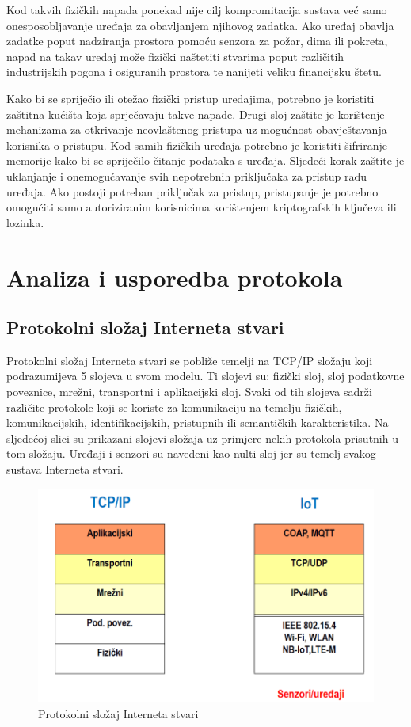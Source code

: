 \documentclass[times, utf8, diplomski]{fer}
\begin{document}
Kod takvih fizičkih napada ponekad nije cilj kompromitacija sustava već samo onesposobljavanje uređaja za obavljanjem njihovog zadatka. Ako uređaj obavlja zadatke poput nadziranja prostora pomoću senzora za požar, dima ili pokreta, napad na takav uređaj može fizički naštetiti stvarima poput različitih industrijskih pogona i osiguranih prostora te nanijeti veliku financijsku štetu.

Kako bi se spriječio ili otežao fizički pristup uređajima, potrebno je koristiti zaštitna kućišta koja sprječavaju takve napade. Drugi sloj zaštite je korištenje mehanizama za otkrivanje neovlaštenog pristupa uz mogućnost obavještavanja korisnika o pristupu. Kod samih fizičkih uređaja potrebno je koristiti šifriranje memorije kako bi se spriječilo čitanje podataka s uređaja. Sljedeći korak zaštite je uklanjanje i onemogućavanje svih nepotrebnih priključaka za pristup radu uređaja. Ako postoji potreban priključak za pristup, pristupanje je potrebno omogućiti samo autoriziranim korisnicima korištenjem kriptografskih ključeva ili lozinka.

\chapter{Analiza i usporedba protokola}

\section{Protokolni složaj Interneta stvari}
Protokolni složaj Interneta stvari se pobliže temelji na TCP/IP složaju koji podrazumijeva 5 slojeva u svom modelu. Ti slojevi su: fizički sloj, sloj podatkovne poveznice, mrežni, transportni i aplikacijski sloj. Svaki od tih slojeva sadrži različite protokole koji se koriste za komunikaciju na temelju fizičkih, komunikacijskih, identifikacijskih, pristupnih ili semantičkih karakteristika. Na sljedećoj slici su prikazani slojevi složaja uz primjere nekih protokola prisutnih u tom složaju. Uređaji i senzori su navedeni kao nulti sloj jer su temelj svakog sustava Interneta stvari. 
\begin{figure}[htb]
    \centering
    \includegraphics[width=14cm]{images/iot-stack.png}
    \caption{Protokolni složaj Interneta stvari\citep{InternetStvari}}
    \label{fig:iotstack}
\end{figure}
\end{document}

